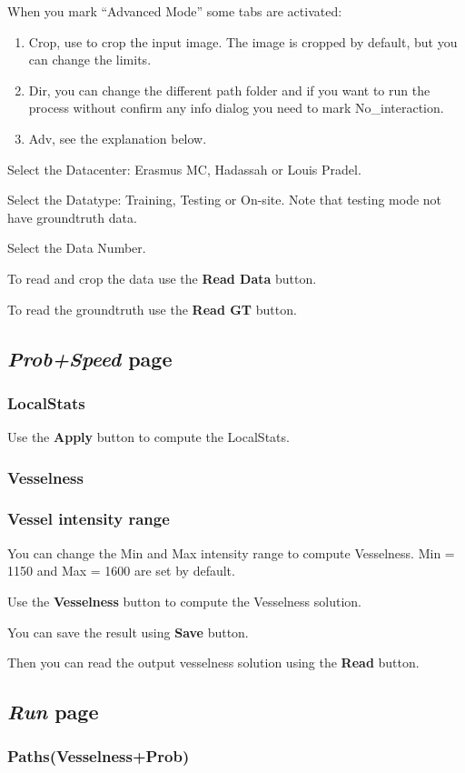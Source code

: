 \documentclass{article}
\begin{document}
When you mark ``Advanced Mode'' some tabs are activated:
\begin{enumerate}
  \item Crop, use to crop the input image. The image is cropped by default, but you can change the limits.
  \item Dir, you can change the different path folder and if you want to run the process without confirm any info dialog you need to mark No\_interaction.
  \item Adv, see the explanation below.
\end{enumerate}

Select the Datacenter: Erasmus MC, Hadassah or Louis Pradel.


Select the Datatype: Training, Testing or On-site. Note that testing mode not have groundtruth data.


Select the Data Number.


To read and crop the data use the {\bf Read Data} button.


To read the groundtruth use the {\bf Read GT} button.

\subsection{\emph{Prob+Speed} page}
\subsubsection{LocalStats}
Use the {\bf Apply} button to compute the LocalStats.
\subsubsection{Vesselness}
\subsubsection{Vessel intensity range}
You can change the Min and Max intensity range to compute Vesselness. Min = 1150 and Max = 1600 are set by default.

Use the {\bf Vesselness} button to compute the Vesselness solution.


You can save the result using {\bf Save} button.


Then you can read the output vesselness solution using the {\bf Read} button.
\subsection{\emph{Run} page}
\subsubsection{Paths(Vesselness+Prob)}
\end{document}
